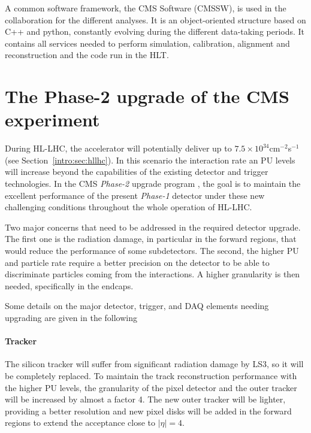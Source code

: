\documentclass[../main.tex]{subfiles}
\begin{document}
A common software framework, the CMS Software (CMSSW), is used in the collaboration for the different analyses. It is an object-oriented structure based on C++ and python, constantly evolving during the different data-taking periods. It contains all services needed to perform simulation, calibration, alignment and reconstruction and the code run in the HLT. 




\section{The Phase-2 upgrade of the CMS experiment}

During HL-LHC, the accelerator will potentially deliver up to $7.5\times10^{34}$cm${}^{-2}$s${}^{-1}$ (see Section~\ref{intro:sec:hllhc}). In this scenario the interaction rate an PU levels will increase beyond the capabilities of the existing detector and trigger technologies. In the CMS \textit{Phase-2} upgrade program \cite{intro:exp:phase2_upgrade}, the goal is to maintain the excellent performance of the present \textit{Phase-1} detector under these new challenging conditions throughout the whole operation of HL-LHC.

Two major concerns that need to be addressed in the required detector upgrade. The first one is the radiation damage, in particular in the forward regions, that would reduce the performance of some subdetectors. The second, the higher PU and particle rate require a better precision on the detector to be able to discriminate particles coming from the interactions. A higher granularity is then needed, specifically in the endcaps. 

Some details on the major detector, trigger, and DAQ elements needing upgrading are given in the following

\paragraph{Tracker}

The silicon tracker will suffer from significant radiation damage by LS3, so it will be completely replaced. To maintain the track reconstruction performance with the higher PU levels, the granularity of the pixel detector and the outer tracker will be increased by almost a factor 4. The new outer tracker will be lighter, providing a better resolution and new pixel disks will be added in the forward regions to extend the acceptance close to $|\eta| = 4$.
\end{document}
